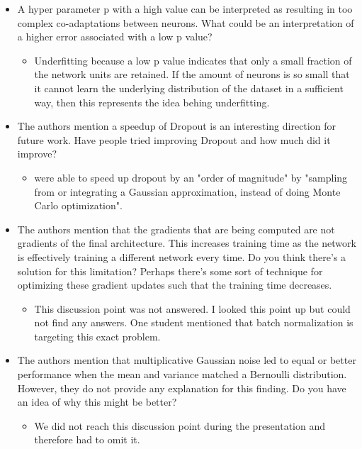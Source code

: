 \documentclass[a4paper]{article}
\begin{document}
\begin{itemize}
	
	\item A hyper parameter p with a high value can be interpreted as resulting in too complex co-adaptations between neurons. What could be an interpretation of a higher error associated with a low p value?
		\begin{itemize}
			\item Underfitting because a low p value indicates that only a small fraction of the network units are retained. If the amount of neurons is so small that it cannot learn the underlying distribution of the dataset in a sufficient way, then this represents the idea behing underfitting.
		\end{itemize}
	
	
	\item The authors mention a speedup of Dropout is an interesting direction for future work. Have people tried improving Dropout and how much did it improve?
		\begin{itemize}
			\item \cite{wang2013fast} were able to speed up dropout by an "order of magnitude" by "sampling from or integrating a Gaussian approximation, instead of doing Monte Carlo optimization".
		\end{itemize}
	
	
	\item The authors mention that the gradients that are being computed are not gradients of the final architecture. This increases training time as the network is effectively training a different network every time. Do you think there's a solution for this limitation? Perhaps there's some sort of technique for optimizing these gradient updates such that the training time decreases.
		\begin{itemize}
			\item This discussion point was not answered. I looked this point up but could not find any answers. One student mentioned that batch normalization is targeting this exact problem.
		\end{itemize}
	
	
	\item The authors mention that multiplicative Gaussian noise led to equal or better performance when the mean and variance matched a Bernoulli distribution. However, they do not provide any explanation for this finding. Do you have an idea of why this might be better?
		\begin{itemize}
			\item We did not reach this discussion point during the presentation and therefore had to omit it.
		\end{itemize}
	
\end{itemize} 




 
\end{document}

